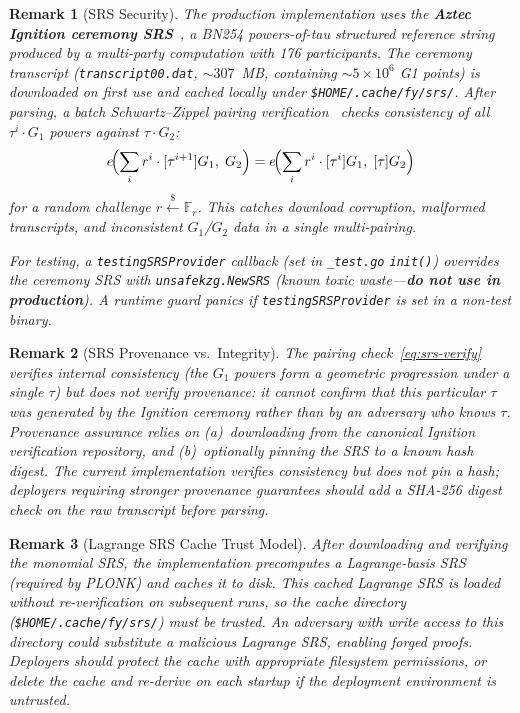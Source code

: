 \documentclass[11pt,a4paper]{article}
\newtheorem{remark}{Remark}[section]
\newcommand{\F}{\mathbb{F}}
\newcommand{\Fr}{\F_r}
\newcommand{\getsr}{\xleftarrow{\$}}
\begin{document}
\begin{remark}[SRS Security]
  \label{rem:srs}
  The production implementation uses the \textbf{Aztec Ignition ceremony SRS}~\cite{aztec-ignition},
  a BN254 powers-of-tau structured reference string produced by a multi-party
  computation with 176 participants. The ceremony transcript
  (\texttt{transcript00.dat}, ${\sim}307$~MB, containing ${\sim}5 \times 10^6$
  G1 points) is downloaded on first use and cached locally under
  \texttt{\$HOME/.cache/fy/srs/}. After parsing, a batch Schwartz--Zippel
  pairing verification~\cite{schwartz1980} checks consistency of all $\tau^i
  \cdot G_1$ powers against $\tau \cdot G_2$:
  \begin{equation}
    e\!\Bigl(\sum_i r^i \cdot [\tau^{i+1}]G_1,\; G_2\Bigr)
    = e\!\Bigl(\sum_i r^i \cdot [\tau^i]G_1,\; [\tau]G_2\Bigr)
    \label{eq:srs-verify}
  \end{equation}
  for a random challenge $r \getsr \Fr$. This catches download corruption,
  malformed transcripts, and inconsistent $G_1$/$G_2$ data in a single
  multi-pairing.

  For testing, a \texttt{testingSRSProvider} callback (set in
  \texttt{\_test.go} \texttt{init()}) overrides the ceremony SRS with
  \texttt{unsafekzg.NewSRS} (known toxic waste---\textbf{do not use in
  production}). A runtime guard panics if \texttt{testingSRSProvider} is set
  in a non-test binary.
\end{remark}

\begin{remark}[SRS Provenance vs.\ Integrity]
  \label{rem:srs-provenance}
  The pairing check~\eqref{eq:srs-verify} verifies \emph{internal consistency}
  (the $G_1$ powers form a geometric progression under a single $\tau$) but does
  \emph{not} verify \emph{provenance}: it cannot confirm that this particular
  $\tau$ was generated by the Ignition ceremony rather than by an adversary who
  knows $\tau$. Provenance assurance relies on (a)~downloading from the
  canonical Ignition verification repository, and (b)~optionally pinning the
  SRS to a known hash digest.  The current implementation verifies consistency
  but does not pin a hash; deployers requiring stronger provenance guarantees
  should add a SHA-256 digest check on the raw transcript before parsing.
\end{remark}

\begin{remark}[Lagrange SRS Cache Trust Model]
  \label{rem:lagrange-cache}
  After downloading and verifying the monomial SRS, the implementation precomputes
  a Lagrange-basis SRS (required by PLONK) and caches it to disk. This cached
  Lagrange SRS is loaded \emph{without re-verification} on subsequent runs, so
  the cache directory (\texttt{\$HOME/.cache/fy/srs/}) must be trusted.
  An adversary with write access to this directory could substitute a malicious
  Lagrange SRS, enabling forged proofs. Deployers should protect the cache with
  appropriate filesystem permissions, or delete the cache and re-derive on each
  startup if the deployment environment is untrusted.
\end{remark}
\end{document}
